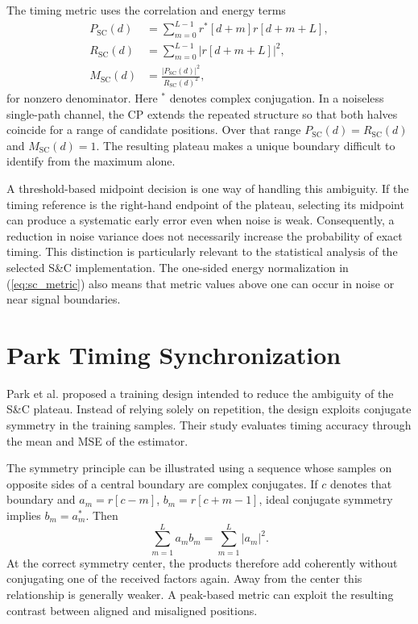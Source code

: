 The timing metric uses the correlation and energy terms
\begin{align}
 P_{\mathrm{SC}}(d)&=\sum_{m=0}^{L-1}r^*[d+m]r[d+m+L],\\
 R_{\mathrm{SC}}(d)&=\sum_{m=0}^{L-1}|r[d+m+L]|^2,\\
 M_{\mathrm{SC}}(d)&=\frac{|P_{\mathrm{SC}}(d)|^2}{R_{\mathrm{SC}}(d)^2},
 \label{eq:sc_metric}
\end{align}
for nonzero denominator. Here $^*$ denotes complex conjugation. In a noiseless single-path channel, the CP extends the repeated structure so that both halves coincide for a range of candidate positions. Over that range $P_{\mathrm{SC}}(d)=R_{\mathrm{SC}}(d)$ and $M_{\mathrm{SC}}(d)=1$. The resulting plateau makes a unique boundary difficult to identify from the maximum alone.

A threshold-based midpoint decision is one way of handling this ambiguity. If the timing reference is the right-hand endpoint of the plateau, selecting its midpoint can produce a systematic early error even when noise is weak. Consequently, a reduction in noise variance does not necessarily increase the probability of exact timing. This distinction is particularly relevant to the statistical analysis of the selected S\&C implementation. The one-sided energy normalization in (\ref{eq:sc_metric}) also means that metric values above one can occur in noise or near signal boundaries.

\section{Park Timing Synchronization}
Park et al. \cite{park2003} proposed a training design intended to reduce the ambiguity of the S\&C plateau. Instead of relying solely on repetition, the design exploits conjugate symmetry in the training samples. Their study evaluates timing accuracy through the mean and MSE of the estimator.

The symmetry principle can be illustrated using a sequence whose samples on opposite sides of a central boundary are complex conjugates. If $c$ denotes that boundary and $a_m=r[c-m]$, $b_m=r[c+m-1]$, ideal conjugate symmetry implies $b_m=a_m^*$. Then
\begin{equation}
 \sum_{m=1}^{L}a_m b_m=\sum_{m=1}^{L}|a_m|^2.
\end{equation}
At the correct symmetry center, the products therefore add coherently without conjugating one of the received factors again. Away from the center this relationship is generally weaker. A peak-based metric can exploit the resulting contrast between aligned and misaligned positions.


